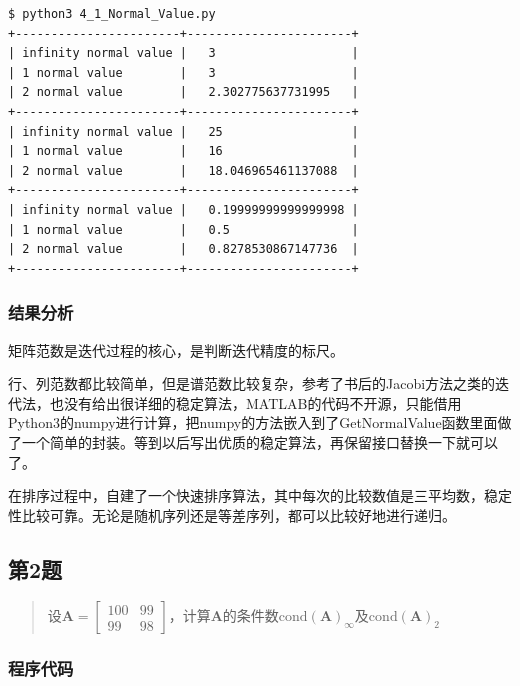 \begin{lstlisting}[style = bash]
$ python3 4_1_Normal_Value.py 
+-----------------------+-----------------------+
| infinity normal value |   3                   |
| 1 normal value        |   3                   |
| 2 normal value        |   2.302775637731995   |
+-----------------------+-----------------------+
| infinity normal value |   25                  |
| 1 normal value        |   16                  |
| 2 normal value        |   18.046965461137088  |
+-----------------------+-----------------------+
| infinity normal value |   0.19999999999999998 |
| 1 normal value        |   0.5                 |
| 2 normal value        |   0.8278530867147736  |
+-----------------------+-----------------------+
\end{lstlisting}

\subsubsection{结果分析}

矩阵范数是迭代过程的核心，是判断迭代精度的标尺。

行、列范数都比较简单，但是谱范数比较复杂，参考了书后的Jacobi方法之类的迭代法，也没有给出很详细的稳定算法，MATLAB的代码不开源，只能借用Python3的numpy进行计算，把numpy的方法嵌入到了GetNormalValue函数里面做了一个简单的封装。等到以后写出优质的稳定算法，再保留接口替换一下就可以了。

在排序过程中，自建了一个快速排序算法，其中每次的比较数值是三平均数，稳定性比较可靠。无论是随机序列还是等差序列，都可以比较好地进行递归。

\subsection{第2题}
\begin{quote}
    设$\mathbf{A}=\left[ \begin{array}{rr}{100} & {99} \\ {99} & {98}\end{array}\right]$，计算$\mathbf{A}$的条件数$\mathrm{cond}(\mathbf{A})_{\infty}$及$\mathrm{cond}(\mathbf{A})_{2}$
\end{quote}

\subsubsection{程序代码}




